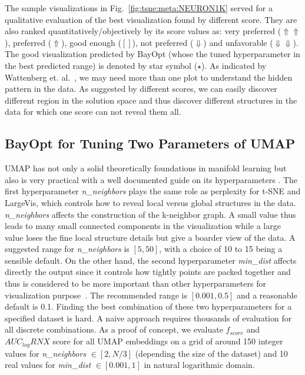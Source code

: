 The sample visualizations in Fig.~\ref{fig:tsne:meta:NEURON1K} served for a qualitative evaluation of the best visualization found by different score.
They are also ranked quantitatively/objectively by its score values as: very preferred ($\Uparrow\Uparrow$), preferred ($\Uparrow$), good enough ($[]$), not preferred ($\Downarrow$) and unfavorable ($\Downarrow\Downarrow$).
The good visualization predicted by BayOpt (whose the tuned hyperparameter in the best predicted range) is denoted by star symbol ($\star$).
As indicated by Wattenberg et. al.~\cite{wattenberg2016use}, we may need more than one plot to understand the hidden pattern in the data.
As suggested by different scores, we can easily discover different region in the solution space and thus discover different structures in the data for which one score can not reveal them all.


\subsection{BayOpt for Tuning Two Parameters of UMAP}\label{sec:result:bo:umap}
UMAP has not only a solid theoretically foundations in manifold learning but also is very practical with a well documented guide on its hyperparameters \cite{mcinnes2018umap-software}.
The first hyperparameter \emph{n\_neighbors} plays the same role as perplexity for t-SNE and LargeVis, which controls how to reveal local versus global structures in the data.
\emph{n\_neighbors} affects the construction of the k-neighbor graph.
A small value thus leads to many small connected components in the visualization while a large value loses the fine local structure details but give a boarder view of the data.
A suggested range for \emph{n\_neighbors} is $[5, 50]$, with a choice of 10 to 15 being a sensible default.
On the other hand, the second hyperparameter \emph{min\_dist} affects directly the output since it controls how tightly points are packed together and thus is considered to be more important than other hyperparameters for visualization purpose~\cite[Sec.4.3]{mcinnes2018umap}.
The recommended range is $[0.001, 0.5]$ and a reasonable default is 0.1.
Finding the best combination of these two hyperparameters for a specified dataset is hard.
A naive approach requires thousands of evaluation for all discrete combinations.
As a proof of concept, we evaluate $f_{score}$ and $AUC_{log}RNX$ score for all UMAP embeddings on a grid of around 150 integer values for \emph{n\_neighbors} $\in [2, N/3]$ (depending the size of the dataset) and 10 real values for \emph{min\_dist} $\in [0.001, 1]$ in natural logarithmic domain.

